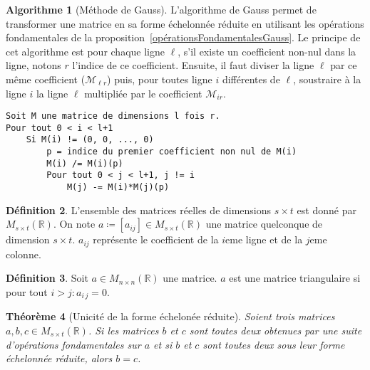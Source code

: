 \documentclass{article}
\newcommand{\R}{\mathbb R}
\newcommand{\M}[3]{M_{#1 \times #2}(#3)}
\newtheorem{thm}{Théorème}[section]
\theoremstyle{definition}
\newtheorem{alg}[thm]{Algorithme}
\newtheorem{déf}[thm]{Définition}
\theoremstyle{remark}
\begin{document}
		\begin{alg}[Méthode de Gauss]\label{algoGauss} L'algorithme de Gauss permet de transformer une matrice en sa forme échelonnée réduite en utilisant les opérations
		fondamentales de la proposition~\ref{opérationsFondamentalesGauss}. Le principe de cet algorithme est pour chaque ligne $\ell$, s'il existe un coefficient non-nul
		dans la ligne, notons $r$ l'indice de ce coefficient. Ensuite, il faut diviser la ligne $\ell$ par ce même coefficient ($\mathcal M_{\ell r}$) puis, pour toutes
		ligne $i$ différentes de $\ell$, soustraire à la ligne $i$ la ligne $\ell$ multipliée par le coefficient $\mathcal M_{i r}$.
\begin{verbatim}
Soit M une matrice de dimensions l fois r.
Pour tout 0 < i < l+1
    Si M(i) != (0, 0, ..., 0)
        p = indice du premier coefficient non nul de M(i)
        M(i) /= M(i)(p)
        Pour tout 0 < j < l+1, j != i
            M(j) -= M(i)*M(j)(p)
\end{verbatim}
		\end{alg}

		\begin{déf} L'ensemble des matrices réelles de dimensions $s \times t$ est donné par $\M st\R$. On note $a \coloneqq [a_{ij}] \in M_{s \times t}(\R)$
		une matrice quelconque de dimension $s \times t$. $a_{ij}$ représente le coefficient de la $i$eme ligne et de la $j$eme colonne. \end{déf}
		
		\begin{déf} Soit $a \in \M nn\R$ une matrice. $a$ est une matrice triangulaire si pour tout $i > j : a_{i\,j} = 0$. \end{déf}

		\begin{thm}[Unicité de la forme échelonée réduite] Soient trois matrices $a, b, c \in \M st\R$. Si les matrices $b$ et $c$ sont toutes deux obtenues par une suite
		d'opérations fondamentales sur $a$ et si $b$ et $c$ sont toutes deux sous leur forme échelonnée réduite, alors $b = c$. \end{thm}
\end{document}
